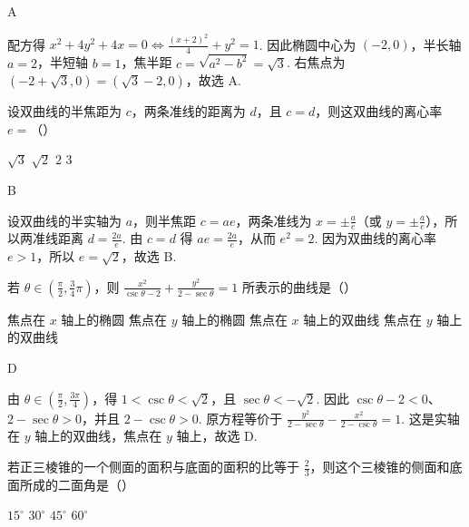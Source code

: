 \documentclass[UTF8,a4paper,oneside,11pt]{ctexbook}
\begin{document}
\begin{answer}A\end{answer}

\begin{solution}
配方得 \(x^{2}+4y^{2}+4x=0\iff\frac{(x+2)^{2}}4+y^{2}=1\). 因此椭圆中心为 \((-2,0)\)，半长轴 \(a=2\)，半短轴 \(b=1\)，焦半距 \(c=\sqrt{a^{2}-b^{2}}=\sqrt3\). 右焦点为 \((-2+\sqrt3,0)=(\sqrt3-2,0)\)，故选 A.
\end{solution}

\begin{problem}
设双曲线的半焦距为 \(c\)，两条准线的距离为 \(d\)，且 \(c=d\)，则这双曲线的离心率 \(e=\)（\quad）

\choices
{\(\sqrt3\)}
{\(\sqrt2\)}
{\(2\)}
{\(3\)}
\end{problem}

\begin{answer}B\end{answer}

\begin{solution}
设双曲线的半实轴为 \(a\)，则半焦距 \(c=ae\)，两条准线为 \(x=\pm\frac ae\)（或 \(y=\pm\frac ae\)），所以两准线距离 \(d=\frac{2a}{e}\). 由 \(c=d\) 得 \(ae=\frac{2a}{e}\)，从而 \(e^{2}=2\). 因为双曲线的离心率 \(e>1\)，所以 \(e=\sqrt2\)，故选 B.
\end{solution}

\begin{problem}
若 \(\theta\in\left(\frac\pi2,\frac34\pi\right)\)，则 \(\displaystyle\frac{x^{2}}{\csc\theta-2}+\frac{y^{2}}{2-\sec\theta}=1\) 所表示的曲线是（\quad）

\choices
{焦点在 \(x\) 轴上的椭圆}
{焦点在 \(y\) 轴上的椭圆}
{焦点在 \(x\) 轴上的双曲线}
{焦点在 \(y\) 轴上的双曲线}
\end{problem}

\begin{answer}D\end{answer}

\begin{solution}
由 \(\theta\in\left(\frac\pi2,\frac{3\pi}{4}\right)\)，得 \(1<\csc\theta<\sqrt2\)，且 \(\sec\theta<-\sqrt2\). 因此 \(\csc\theta-2<0\)、\(2-\sec\theta>0\)，并且 \(2-\csc\theta>0\). 原方程等价于
\(\displaystyle\frac{y^{2}}{2-\sec\theta}-\frac{x^{2}}{2-\csc\theta}=1\).
这是实轴在 \(y\) 轴上的双曲线，焦点在 \(y\) 轴上，故选 D.
\end{solution}

\begin{problem}
若正三棱锥的一个侧面的面积与底面的面积的比等于 \(\frac23\)，则这个三棱锥的侧面和底面所成的二面角是（\quad）

\choices
{\(15^{\circ}\)}
{\(30^{\circ}\)}
{\(45^{\circ}\)}
{\(60^{\circ}\)}
\end{problem}
\end{document}
